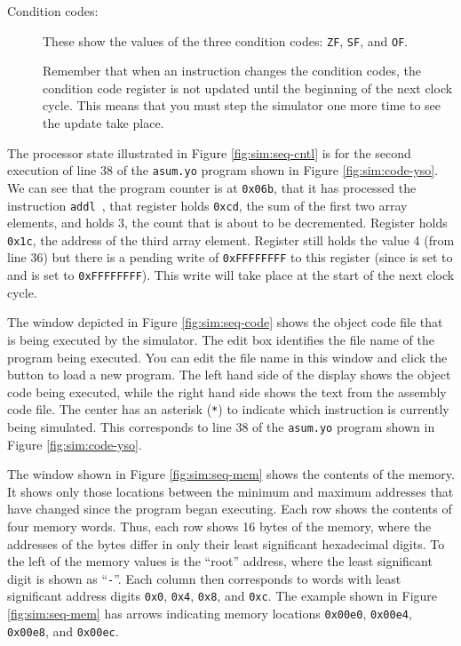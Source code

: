 \documentclass[11pt]{article}
\begin{document}
\begin{description}
\item[Condition codes:]
These show the values of the three condition codes: 
\texttt{ZF}, \texttt{SF}, and \texttt{OF}\@.

Remember that when an instruction changes the condition codes, the
condition code register is not updated until the beginning of the next clock
cycle.  This means that you must step the simulator one more time to
see the update take place.

\end{description}

The processor state illustrated in Figure \ref{fig:sim:seq-cntl} is
for the second execution of line 38 of the \texttt{asum.yo} program
shown in Figure \ref{fig:sim:code-yso}.  We can see that the program
counter is at \texttt{0x06b}, that it has processed the instruction
\texttt{addl \ebxreg{} \ecxreg{}}, that register \eaxreg{} holds
\texttt{0xcd}, the sum of the first two array elements, and \edxreg{}
holds 3, the count that is about to be decremented.  Register
\ecxreg{} holds \texttt{0x1c}, the address of the third array
element.  Register \ebxreg{} still holds the value 4 (from line 36) but there 
is a pending write of \texttt{0xFFFFFFFF} to this register
(since  is set to \ebxreg{} and  is set
to \texttt{0xFFFFFFFF}).  This write will take place at the start of the
next clock cycle.

The window depicted in Figure \ref{fig:sim:seq-code} shows the object
code file that is being executed by the simulator.%
The edit box
identifies the file name of the program being executed.  You can edit
the file name in this window and click the  button to load
a new program.  The left hand side of the display shows the object
code being executed, while the right hand side shows the text from the
assembly code file.  The center has an asterisk (\texttt{*}) to
indicate which instruction is currently being simulated.  This
corresponds to line 38 of the \texttt{asum.yo} program shown in Figure
\ref{fig:sim:code-yso}.

The window shown in Figure \ref{fig:sim:seq-mem} shows the contents of
the memory.  It shows only those locations between the minimum and
maximum addresses that have changed since the program began executing.
Each row shows the contents of four memory words.  Thus, each row
shows 16 bytes of the memory, where the addresses of the bytes differ
in only their least significant hexadecimal digits.  To the left of
the memory values is the ``root'' address, where the least significant
digit is shown as ``\texttt{-}''.  Each column then corresponds to
words with least significant address digits \texttt{0x0},
\texttt{0x4}, \texttt{0x8}, and \texttt{0xc}.  The example shown in
Figure \ref{fig:sim:seq-mem} has arrows indicating memory locations \texttt{0x00e0},
\texttt{0x00e4}, \texttt{0x00e8}, and
\texttt{0x00ec}.
\end{document}
